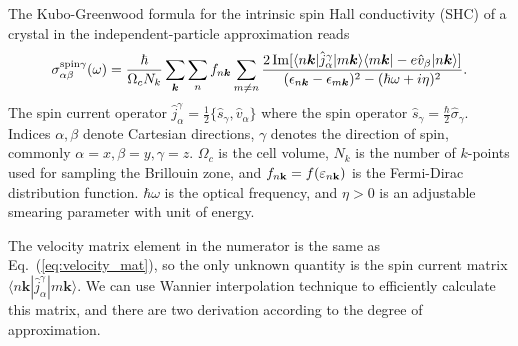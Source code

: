 The Kubo-Greenwood formula for the intrinsic spin Hall conductivity (SHC) of a crystal
in the independent-particle approximation reads \cite{qiao-prb2018,ryoo-prb2019,guo-prl2008}
%
\begin{equation}
\label{eq:kubo_shc}
\sigma_{\alpha\beta}^{\text{spin}\gamma}(\omega) =  \frac{\hbar}{\Omega_c N_k}
\sum_{\bm{k}}\sum_{n} f_{n\bm{k}} \\
\sum_{m \neq n}
\frac{2\operatorname{Im}[\langle n\bm{k}| \hat{j}_{\alpha}^{\gamma}|m\bm{k}\rangle
	\langle m\bm{k}| -e\hat{v}_{\beta}|n\bm{k}\rangle]}
{(\epsilon_{n\bm{k}}-\epsilon_{m\bm{k}})^2-(\hbar\omega +i\eta)^2}.
\end{equation}
%
The spin current operator 
$\hat{j}_{\alpha}^{\gamma}=
\frac{1}{2}\{\hat{s}_{\gamma},\hat{v}_{\alpha}\}$ where the spin operator $\hat{s}_{\gamma}=\frac{\hbar}{2}\hat{\sigma}_{\gamma}$. Indices $\alpha,\beta$ denote Cartesian directions, $\gamma$ denotes the direction of spin, commonly $\alpha = x, \beta = y, \gamma = z$.  $\Omega_c$ is the
cell volume, $N_k$ is the number of $k$-points used for sampling the
Brillouin zone, and $f_{n{\bf k}}=f(\varepsilon_{n{\bf k}})$ is the
Fermi-Dirac distribution function. $\hbar\omega$ is the optical
frequency, and $\eta>0$ is an adjustable smearing parameter with unit
of energy.

The velocity matrix element in the numerator is the same as   Eq.~(\ref{eq:velocity_mat}), 
so the only unknown quantity is the spin current matrix $\langle n\bm{k}| \hat{j}_{\alpha}^{\gamma}|m\bm{k}\rangle$. 
We can use Wannier interpolation technique to efficiently calculate this matrix, and there are two derivation according to the degree of approximation.

